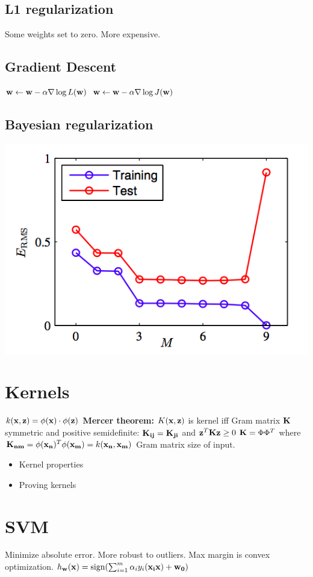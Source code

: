 \subsection{L1 regularization}
Some weights set to zero. More expensive. 
\subsection{Gradient Descent}
$\mathbf{w} \leftarrow \mathbf{w} - \alpha \nabla \log L(\mathbf{w})$
$\mathbf{w} \leftarrow \mathbf{w} - \alpha \nabla \log J(\mathbf{w})$

\subsection{Bayesian regularization}


\includegraphics[width=0.5\linewidth]{error.png}

\section{Kernels}
$k(\mathbf{x}, \mathbf{z}) = \phi(\mathbf{x}) \cdot \phi(\mathbf{z})$
{\bf Mercer theorem:} $K(\mathbf{x}, \mathbf{z})$ is kernel iff Gram matrix $\mathbf{K}$ symmetric and positive semidefinite: $\mathbf{K_{ij}} = \mathbf{K_{ji}}$ and $\mathbf{z}^{T}\mathbf{K}\mathbf{z} \geq 0$
$\mathbf{K} = \Phi\Phi^T$ where $\mathbf{K_{nm}} = \phi(\mathbf{x_n})^T\phi(\mathbf{x_m}) = k(\mathbf{x_n}, \mathbf{x_m})$ Gram matrix size of input.


\begin{itemize}
\item Kernel properties
\item Proving kernels
\end{itemize}

\section{SVM}
Minimize absolute error. More robust to outliers. Max margin is convex optimization.
$h_{\mathbf{w}}(\mathbf{x}) = \text{sign}(\sum_{i=1}^m \alpha_{i}y_{i}(\mathbf{x_{i}}\mathbf{x}) + \mathbf{w_0})$

